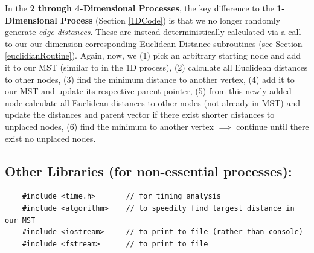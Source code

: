 \documentclass[conference]{styles/acmsiggraph}
\newcommand{\?}{\stackrel{?}{=}}
\begin{document}
In the \textbf{2 through 4-Dimensional Processes}, the key difference to the \textbf{1-Dimensional Process} (Section \ref{1DCode}) is that we no longer randomly generate \textit{edge distances}.  These are instead deterministically calculated via a call to our our dimension-corresponding Euclidean Distance subroutines (see Section \ref{euclidianRoutine}).  Again, now, we (1) pick an arbitrary starting node and add it to our MST (similar to in the 1D process), (2) calculate all Euclidean distances to other nodes, (3) find the minimum distance to another vertex, (4) add it to our MST and update its respective parent pointer, (5) from this newly added node calculate all Euclidean distances to other nodes (not already in MST) and update the distances and parent vector if there exist shorter distances to unplaced nodes, (6) find the minimum to another vertex $\implies$ continue until there exist no unplaced nodes.

\subsection{Other Libraries (for non-essential processes):} \label{section:otherlibraries}
\begin{verbatim}
    #include <time.h>       // for timing analysis
    #include <algorithm>    // to speedily find largest distance in our MST
    #include <iostream>     // to print to file (rather than console)
    #include <fstream>      // to print to file
\end{verbatim}
\end{document}
